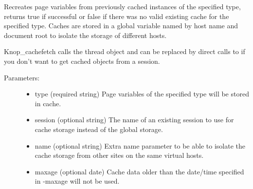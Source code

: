 \documentclass[letterpaper,10pt,english]{sphinxmanual}
\begin{document}
\begin{fulllineitems}
Recreates page variables from previously cached instances of the specified type,
returns true if successful or false if there was no valid existing cache for the
specified type. Caches are stored in a global variable named by host name and
document root to isolate the storage of different hosts.

Knop\_cachefetch calls the thread object {\hyperref[knop_cache:knop_cache]{}} and can be replaced
by direct calls to {\hyperref[knop_cache:knop_cache]{}} if you don't want to get cached objects
from a session.
\begin{description}
\item[{Parameters:}] \leavevmode\begin{itemize}
\item {} 
type (required string)
Page variables of the specified type will be stored in cache.

\item {} 
session (optional string)
The name of an existing session to use for cache storage instead of the global storage.

\item {} 
name (optional string)
Extra name parameter to be able to isolate the cache storage from other sites on the same virtual hosts.

\item {} 
maxage (optional date)
Cache data older than the date/time specified in -maxage will not be used.

\end{itemize}

\end{description}

\end{fulllineitems}


\begin{fulllineitems}
\label{knop_cache:knop_cachestore}
\end{fulllineitems}

\end{document}
